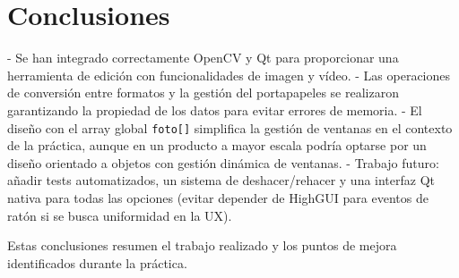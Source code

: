 \section{Conclusiones}

- Se han integrado correctamente OpenCV y Qt para proporcionar una herramienta de edición con funcionalidades de imagen y vídeo.
- Las operaciones de conversión entre formatos y la gestión del portapapeles se realizaron garantizando la propiedad de los datos para evitar errores de memoria.
- El diseño con el array global \texttt{foto[]} simplifica la gestión de ventanas en el contexto de la práctica, aunque en un producto a mayor escala podría optarse por un diseño orientado a objetos con gestión dinámica de ventanas.
- Trabajo futuro: añadir tests automatizados, un sistema de deshacer/rehacer y una interfaz Qt nativa para todas las opciones (evitar depender de HighGUI para eventos de ratón si se busca uniformidad en la UX).

Estas conclusiones resumen el trabajo realizado y los puntos de mejora identificados durante la práctica.
